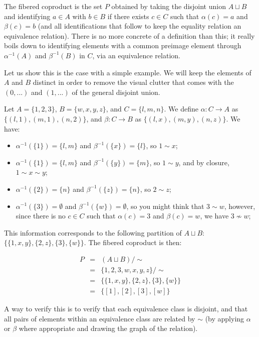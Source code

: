 The fibered coproduct is the set $P$ obtained by taking the disjoint union $A \sqcup B$ and identifying $a \in A$ with $b \in B$ if there exists $c \in C$ such that $\alpha(c) = a$ and $\beta(c) = b$ (and all identifications that follow to keep the equality relation an equivalence relation). There is no more concrete of a definition than this; it really boils down to identifying elements with a common preimage element through $\alpha^{-1}(A)$ and $\beta^{-1}(B)$ in $C$, via an equivalence relation.

Let us show this is the case with a simple example. We will keep the elements of $A$ and $B$ distinct in order to remove the visual clutter that comes with the $(0, ...)$ and $(1, ...)$ of the general disjoint union.

Let $A = \{ 1, 2, 3 \}$, $B = \{ w, x, y, z \}$, and $C = \{ l, m, n \}$. We define $\alpha : C \to A$ as $\{ (l, 1), (m, 1), (n, 2) \}$, and $\beta : C \to B$ as $\{ (l, x), (m, y), (n, z) \}$. We have:

\begin{itemize}
	\item $\alpha^{-1}(\{1\}) = \{l,m\}$ and $\beta^{-1}(\{x\}) = \{l\}$, so $1 \sim x$;
	\item $\alpha^{-1}(\{1\}) = \{l,m\}$ and $\beta^{-1}(\{y\}) = \{m\}$, so $1 \sim y$, and by closure, $1 \sim x \sim y$;
	\item $\alpha^{-1}(\{2\}) = \{n\}$ and $\beta^{-1}(\{z\}) = \{n\}$, so $2 \sim z$;
	\item $\alpha^{-1}(\{3\}) = \emptyset$ and $\beta^{-1}(\{w\}) = \emptyset$, so you might think that $3 \sim w$, however, since there is no $c \in C$ such that $\alpha(c) = 3$ and $\beta(c) = w$, we have $3 \nsim w$;
\end{itemize}

This information corresponds to the following partition of $A \sqcup B$: $\{ \{1,x,y\}, \{2,z\}, \{3\}, \{w\} \}$. The fibered coproduct is then:

$$
\begin{array}{lll}
P &=& (A \sqcup B) / \sim \\
  &=& \{1,2,3,w,x,y,z\} / \sim \\
  &=& \{\{1,x,y\}, \{2,z\}, \{3\}, \{w\}\} \\
  &=& \{[1], [2], [3], [w]\}
\end{array}
$$

A way to verify this is to verify that each equivalence class is disjoint, and that all pairs of elements within an equivalence class are related by $\sim$ (by applying $\alpha$ or $\beta$ where appropriate and drawing the graph of the relation).
